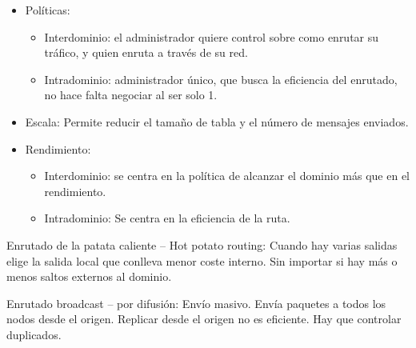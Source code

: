 \documentclass[12pt, twoside, openright]{report} %
\begin{document}
\begin{itemize}
	\item Políticas:

	      \begin{itemize}
		      \item Interdominio: el administrador quiere control sobre como enrutar
		            su tráfico, y quien enruta a través de su red.
		      \item Intradominio: administrador único, que busca la eficiencia del
		            enrutado, no hace falta negociar al ser solo 1.
	      \end{itemize}
	\item Escala: Permite reducir el tamaño de tabla y el número de mensajes
	      enviados.
	\item Rendimiento:

	      \begin{itemize}
		      \item Interdominio: se centra en la política de alcanzar el dominio
		            más que en el rendimiento.
		      \item Intradominio: Se centra en la eficiencia de la ruta.
	      \end{itemize}
\end{itemize}

Enrutado de la patata caliente -- Hot potato routing: Cuando hay
varias salidas elige la salida local que conlleva menor coste
interno. Sin importar si hay más o menos saltos externos al dominio.

Enrutado broadcast -- por difusión: Envío masivo. Envía paquetes a
todos los nodos desde el origen. Replicar desde el origen no es
eficiente. Hay que controlar duplicados.
\end{document}
